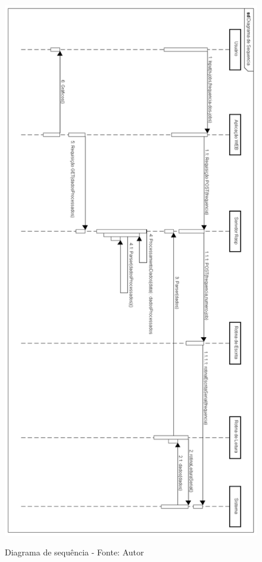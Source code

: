 \begin{figure}[H]
\centering
\includegraphics[keepaspectratio=true,scale=0.5]{figuras/diagrama_sequencia_pc2.png}
\label{fig:diagrama_sequencia_pc2}
\caption{Diagrama de sequência - Fonte: Autor}
\end{figure}

